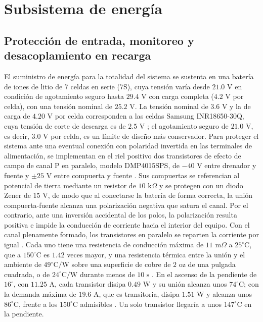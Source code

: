 \documentclass[../../General.tex]{subfiles}
\begin{document}
\section{Subsistema de energía}

\subsection{Protección de entrada, monitoreo y desacoplamiento en recarga}

El suministro de energía para la totalidad del sistema se sustenta en una batería de iones de litio de 7 celdas en serie (7S), cuya tensión varía desde $21.0\text{ V}$ en condición de agotamiento seguro hasta $29.4\text{ V}$ con carga completa ($4.2\text{ V}$ por celda), con una tensión nominal de $25.2\text{ V}$. La tensión nominal de $3.6\text{ V}$ y la de carga de $4.20\text{ V}$ por celda corresponden a las celdas Samsung INR18650-30Q, cuya tensión de corte de descarga es de $2.5\text{ V}$ \citep{samsung_30q}; el agotamiento seguro de $21.0\text{ V}$, es decir, $3.0\text{ V}$ por celda, es un límite de diseño más conservador. Para proteger el sistema ante una eventual conexión con polaridad invertida en las terminales de alimentación, se implementan en el riel positivo dos transistores de efecto de campo de canal P en paralelo, modelo DMP4015SPS, de $-40\text{ V}$ entre drenador y fuente y $\pm 25\text{ V}$ entre compuerta y fuente \citep{diodes_dmp4015sps}. Sus compuertas se referencian al potencial de tierra mediante un resistor de $10\text{ k}\Omega$ y se protegen con un diodo Zener de $15\text{ V}$, de modo que al conectarse la batería de forma correcta, la unión compuerta-fuente alcanza una polarización negativa que satura el canal. Por el contrario, ante una inversión accidental de los polos, la polarización resulta positiva e impide la conducción de corriente hacia el interior del equipo. Con el canal plenamente formado, los transistores en paralelo se reparten la corriente por igual \citep{ti_slva673a}. Cada uno tiene una resistencia de conducción máxima de $11\text{ m}\Omega$ a $25^\circ\text{C}$, que a $150^\circ\text{C}$ es $1.42$ veces mayor, y una resistencia térmica entre la unión y el ambiente de $49^\circ\text{C/W}$ sobre una superficie de cobre de $2\text{ oz}$ de una pulgada cuadrada, o de $24^\circ\text{C/W}$ durante menos de $10\text{ s}$ \citep{diodes_dmp4015sps}. En el ascenso de la pendiente de $16^\circ$, con $11.25\text{ A}$, cada transistor disipa $0.49\text{ W}$ y su unión alcanza unos $74^\circ\text{C}$; con la demanda máxima de $19.6\text{ A}$, que es transitoria, disipa $1.51\text{ W}$ y alcanza unos $86^\circ\text{C}$, frente a los $150^\circ\text{C}$ admisibles \citep{diodes_dmp4015sps}. Un solo transistor llegaría a unos $147^\circ\text{C}$ en la pendiente.
\end{document}
